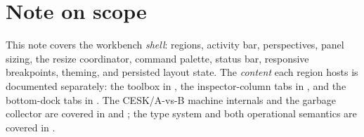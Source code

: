 \documentclass[11pt]{article}
\begin{document}
\section*{Note on scope}
This note covers the workbench \emph{shell}: regions, activity bar,
perspectives, panel sizing, the resize coordinator, command palette,
status bar, responsive breakpoints, theming, and persisted layout state.
The \emph{content} each region hosts is documented separately: the toolbox
in \texttt{}, the inspector-column tabs in
\texttt{}, and the bottom-dock tabs in
\texttt{}. The CESK/A-vs-B machine internals and the
garbage collector are covered in \texttt{} and
\texttt{}; the type system and both operational
semantics are covered in \texttt{}.
\end{document}

